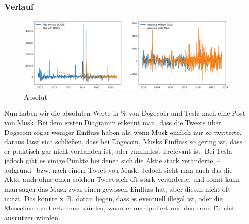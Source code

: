 \documentclass{article}
\begin{document}
\subsubsection{Verlauf}
\begin{figure}[!htb]
  	\includegraphics[width=\textwidth, center]{./imgs/Absolut.png}
 	\caption{Absolut}
 	\label{fig:Absolut}
\end{figure}
Nun haben wir die absoluten Werte in \% von Dogecoin und Tesla nach eine Post von Musk. Bei dem ersten Diagramm erkennt man, dass die Tweets über Dogecoin sogar weniger Einfluss haben als, wenn Musk einfach nur so twitterte, daraus lässt sich schließen, dass bei Dogecoin, Musks Einfluss so gering ist, dass er praktisch gar nicht vorhanden ist, oder zumindest irrelevant ist. Bei Tesla jedoch gibt es einige Punkte bei denen sich die Aktie stark veränderte, --aufgrund-- bzw. nach einem Tweet von Musk. Jedoch sieht man auch das die Aktie auch ohne einen solchen Tweet sich oft stark veränderte, und somit kann man sagen das Musk zwar einen gewissen Einfluss hat, aber diesen nicht oft nutzt. Das könnte z. B. daran liegen, dass es eventuell illegal ist, oder die Menschen sonst erkennen würden, wann er manipuliert und das dann für sich ausnutzen würden.
\end{document}
